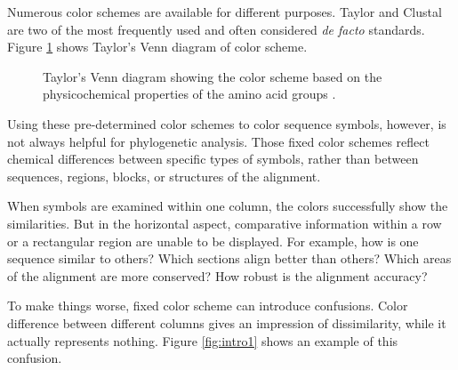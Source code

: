 Numerous color schemes are available for different purposes. Taylor \cite{LIN2002361} and Clustal \cite{Thompsonaa} are two of the most frequently used and often considered \emph{de facto} standards. Figure \ref{fig:procter-2d} shows Taylor's Venn diagram of color scheme.

\begin{figure}[hbt]
\caption[Taylor's Amino Acid Color Scheme]{Taylor's \cite{LIN2002361} Venn diagram showing the color scheme based on the physicochemical properties of the amino acid groups \cite{Procter2010aa}.}\label{fig:procter-2d}
\end{figure}

Using these pre-determined color schemes to color sequence symbols, however, is not always helpful for phylogenetic analysis. Those fixed color schemes reflect chemical differences between specific types of symbols, rather than between sequences, regions, blocks, or structures of the alignment.

When symbols are examined within one column, the colors successfully show the similarities. But in the horizontal aspect, comparative information within a row or a rectangular region are unable to be displayed. For example, how is one sequence similar to others? Which sections align better than others? Which areas of the alignment are more conserved? How robust is the alignment accuracy?

To make things worse, fixed color scheme can introduce confusions. Color difference between different columns gives an impression of dissimilarity, while it actually represents nothing. Figure \ref{fig:intro1} shows an example of this confusion.

